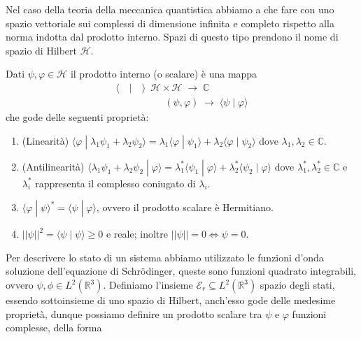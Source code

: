  \noindent Nel caso della teoria della meccanica quantistica abbiamo a che fare con uno spazio vettoriale sui complessi di dimensione infinita e completo rispetto alla norma indotta dal prodotto interno. Spazi di questo tipo prendono il nome di spazio di Hilbert $\mathcal{H}$.
 \newline
 \begin{definition}
  \noindent Dati $\psi,\varphi \in \mathcal{H}$ il prodotto interno (o scalare) \`e una mappa 
  \begin{equation*}
  \begin{array}{l}
  	\langle \quad | \quad \rangle \;  \: \mathcal{H} \times \mathcal{H} \; \to \; \mathbb{C}  \\
  	\quad \quad \quad \quad \quad (\psi , \varphi) \; \to  \; \langle \psi \;|\; \varphi \rangle
  \end{array}
  \end{equation*}	
  che gode delle seguenti propriet\`a:
  \begin{enumerate}
  	\item (Linearit\`a) \quad $\langle \varphi \; | \; \lambda_1\psi_1 + \lambda_2\psi_2\rangle  = \lambda_1 \langle \varphi \; | \; \psi_1 \rangle + \lambda_2 \langle \varphi \;|\; \psi_2 \rangle$ dove $\lambda_1,\lambda_2 \in \mathbb{C}$.
  	\item (Antilinearit\`a) \quad $\langle \lambda_1\psi_1 + \lambda_2\psi_2\;|\; \varphi \rangle = \lambda_1^* \langle \psi_1 \;|\;\varphi \rangle + \lambda_2^* \langle \psi_2 \;|\; \varphi \rangle$ dove $\lambda_1^*,\lambda_2^* \in \mathbb{C}$ e $\lambda_i^*$ rappresenta il complesso coniugato di $\lambda_i$.
  	\item $\langle  \varphi \;|\; \psi \rangle^* = \langle \psi \;|\; \varphi \rangle $, ovvero il prodotto scalare \`e Hermitiano.
  	\item $||\psi||^2 = \langle \psi \;|\; \psi \rangle \geq 0 $ e reale; inoltre $||\psi|| = 0 \iff \psi = 0$.
  \end{enumerate}
 \end{definition}
\noindent Per descrivere lo stato di un sistema abbiamo utilizzato le funzioni d'onda soluzione dell'equazione di Schr\"odinger, queste sono funzioni quadrato integrabili, ovvero $\psi,\phi \in L^2(\mathbb{R}^3)$. Definiamo l'insieme $\mathcal{E}_r \subseteq L^2(\mathbb{R}^3) $ spazio degli stati, essendo sottoinsieme di uno spazio di Hilbert, anch'esso gode delle medesime propriet\`a, dunque possiamo definire un prodotto scalare tra $\psi$ e $\varphi$ funzioni complesse, della forma
